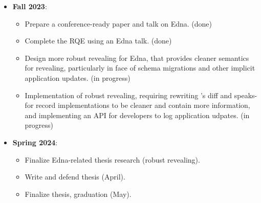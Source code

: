 \begin{itemize}
\item \textbf{Fall 2023}: 
    \begin{itemize}
        \item Prepare a conference-ready paper and talk on Edna. (done)
        \item Complete the RQE using an Edna talk. (done)
        \item Design more robust revealing for Edna, that provides cleaner
            semantics for revealing, particularly in face of schema migrations
            and other implicit application updates. (in progress)
        \item Implementation of robust revealing, requiring rewriting 
            \sys's diff and speaks-for record implementations to be cleaner and
            contain more information, and implementing an API for developers to
            log application udpates. (in progress)
    \end{itemize}
\item \textbf{Spring 2024}: 
    \begin{itemize}
        \item Finalize Edna-related thesis research (robust revealing).
        \item Write and defend thesis (April).
        \item Finalize thesis, graduation (May).
    \end{itemize}
\end{itemize}
